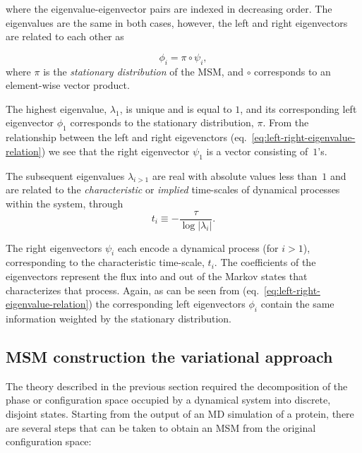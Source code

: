 \documentclass[9pt,tutorial]{livecoms}
\begin{document}
\noindent{}where the eigenvalue-eigenvector pairs are indexed in decreasing order. The eigenvalues are the same in both cases, however, the left and right eigenvectors are related to each other as

\begin{equation}
\phi_i = \pi \circ \psi_i,
\label{eq:left-right-eigenvalue-relation}
\end{equation}
\noindent{}where $\pi$ is the \emph{stationary distribution} of the MSM, and $\circ$ corresponds to an element-wise vector product.

The highest eigenvalue, $\lambda_1$, is unique and is equal to $1$, and its corresponding left eigenvector $\phi_1$ corresponds to the stationary distribution, $\pi$.
From the relationship between the left and right eigevenctors (eq.~\ref{eq:left-right-eigenvalue-relation}) we see that the right eigenvector $\psi_1$ is a vector consisting of~$1$'s.

The subsequent eigenvalues $\lambda_{i>1}$ are real with absolute values less than~$1$ and are related to the \emph{characteristic} or \emph{implied} time-scales of dynamical processes within the system, through
\begin{equation}
	\label{eq:timescales}
	t_i \equiv -\frac{\tau}{\log|\lambda_i|}.
\end{equation}
	
The right eigenvectors $\psi_i$ each encode a dynamical process (for $i>1$), corresponding to the characteristic time-scale, $t_i$. The coefficients of the eigenvectors represent the flux into and out of the Markov states that characterizes that process.
Again, as can be seen from (eq.~\ref{eq:left-right-eigenvalue-relation}) the corresponding left eigenvectors $\phi_i$ contain the same information weighted by the stationary distribution.


\subsection{MSM construction the variational approach}
\label{sec:construction}

The theory described in the previous section required the decomposition of the phase or configuration space occupied by a dynamical system into discrete, disjoint states.
Starting from the output of an MD simulation of a protein, there are several steps that can be taken to obtain an MSM from the original configuration space:
\end{document}
